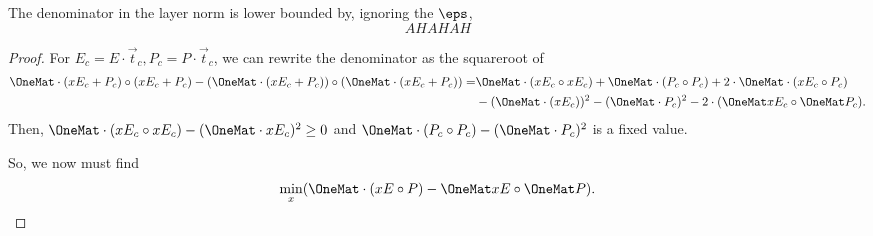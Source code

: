\begin{lemma}
	The denominator in the layer norm is lower bounded by, ignoring the $\eps$,
	\[
		AHAHAH %
	\]
\end{lemma}
\begin{proof}
	For $E_c = E \cdot \vec{t}_c, P_c = P \cdot \vec{t}_c$, we can rewrite the denominator as the squareroot of
	\begin{align*}
		\OneMat \cdot (xE_c + P_c) \circ (xE_c + P_c) - (\OneMat \cdot (xE_c + P_c)) \circ (\OneMat \cdot (xE_c + P_c)) =& \OneMat \cdot (xE_c \circ xE_c) + \OneMat \cdot (P_c \circ P_c) + 2 \cdot \OneMat \cdot (xE_c \circ P_c)	\\
														 &- (\OneMat \cdot (xE_c))^2 - (\OneMat \cdot P_c)^2 - 2 \cdot (\OneMat xE_c \circ \OneMat P_c).
	\end{align*}
	Then, $\OneMat \cdot(xE_c \circ xE_c) - (\OneMat \cdot xE_c)^2 \geq 0$ and $\OneMat \cdot (P_c \circ P_c) - (\OneMat \cdot P_c)^2$ is a fixed value.

	So, we now must find
	\[
		\min_x (\OneMat \cdot (xE \circ P) - \OneMat xE \circ \OneMat P).
	\]
\end{proof}

\pagebreak

